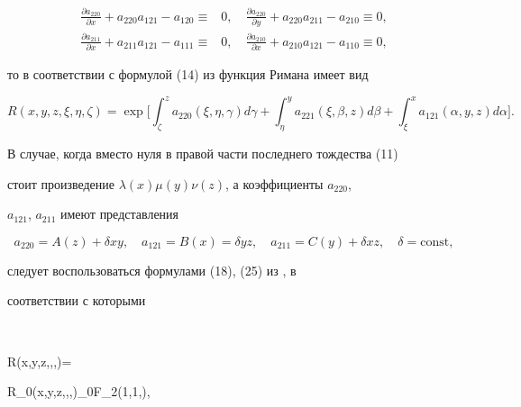 \begin{equation} 


\begin{split} 


\frac{\partial a_{220}}{\partial x} 


+a_{220}a_{121}-a_{120}\equiv & 0,\quad 


\frac{\partial a_{220}}{\partial y} 


+a_{220}a_{211}-a_{210}\equiv0, \\ 


% 


\frac{\partial a_{211}}{\partial x} 


+a_{211}a_{121}-a_{111}\equiv & 0,\quad 


\frac{\partial a_{210}}{\partial x} 


+a_{210}a_{121}-a_{110}\equiv0, 


\end{split} 


\end{equation} 


то в соответствии с формулой (14) из \cite{12} функция Римана имеет вид 


$$ 


R(x,y,z,\xi,\eta,\zeta)=\exp\bigg[\int^z_\zeta 


a_{220}(\xi,\eta,\gamma)d\gamma+\int^y_\eta a_{221} 


(\xi,\beta,z)d\beta+\int^x_{\xi}a_{121}(\alpha,y,z)d\alpha\bigg]. 


$$ 


В случае, когда вместо нуля в правой части последнего тождества (11) 


стоит произведение $\lambda(x)\mu(y)\nu(z)$, а коэффициенты $a_{220}$, 


$a_{121}$, $a_{211}$ имеют представления 


$$ 


a_{220}=A(z)+\delta xy,\quad 


a_{121}=B(x)=\delta yz,\quad 


a_{211}=C(y)+\delta xz,\quad \delta=\text{const}, 


$$ 


следует воспользоваться формулами (18), (25) из \cite{12}, в 


соответствии с которыми 


$$ 


R(x,y,z,\xi,\eta,\zeta)= 


R_0(x,y,z,\xi,\eta,\zeta)\;{}_0F{}_2(1,1,\omega), 


